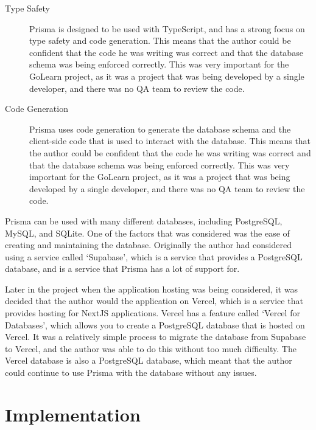 \documentclass[12pt, a4paper,twoside]{report}
\theoremstyle{plain} %
\theoremstyle{definition} %
\numberwithin{equation}{chapter}
\begin{document}
\begin{description}
    \item[Type Safety\cite{prisma-type-safety}] {
        Prisma is designed to be used with TypeScript, and has a strong focus
        on type safety and code generation. This means that the author could
        be confident that the code he was writing was correct and that the
        database schema was being enforced correctly. This was very important
        for the GoLearn project, as it was a project that was being developed
        by a single developer, and there was no QA team to review the code.
        }
    \item[Code Generation\cite{prisma-code-generation}] {
        Prisma uses code generation to generate the database schema and the
        client-side code that is used to interact with the database. This
        means that the author could be confident that the code he was writing
        was correct and that the database schema was being enforced correctly.
        This was very important for the GoLearn project, as it was a project
        that was being developed by a single developer, and there was no QA
        team to review the code.
        }
\end{description}

Prisma can be used with many different databases, including PostgreSQL, MySQL,
and SQLite. One of the factors that was considered was the ease of creating and
maintaining the database. Originally the author had considered using a service
called `Supabase', which is a service that provides a PostgreSQL database, and
is a service that Prisma has a lot of support for.

Later in the project when the application hosting was being considered, it was
decided that the author would the application on Vercel, which is a service that
provides hosting for NextJS applications. Vercel has a feature called `Vercel for
Databases', which allows you to create a PostgreSQL database that is hosted on
Vercel. It was a relatively simple process to migrate the database from Supabase
to Vercel, and the author was able to do this without too much difficulty. The
Vercel database is also a PostgreSQL database, which meant that the author could
continue to use Prisma with the database without any issues.


\chapter{Implementation}\label{ch:implementation}
\end{document}
